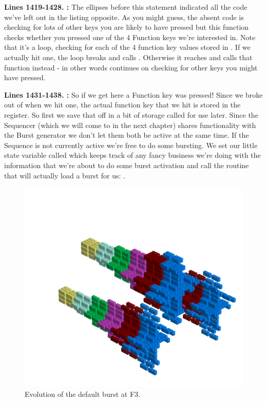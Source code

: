 \textbf{Lines 1419-1428. :} The ellipses before this statement indicated all the code we've
left out in the listing opposite. As you might guess, the absent code is checking for lots of other keys you are likely to have pressed but
this function checks whether you pressed one of the 4 Function keys we're interested in. Note that it's a loop, checking for each of the 4
function key values stored in . If we actually hit one, the loop breaks and calls . Otherwise
it reaches  and calls that function instead - in other words continues on checking for other keys you might have
pressed.

\textbf{Lines 1431-1438. :} So if we get here a Function key was pressed! Since we broke out of 
when we hit one, the actual function key that we hit is stored in the  register. So first we save that off in a bit of storage called
 for use later. Since the Sequencer (which we will come to in the next chapter) shares functionality with the Burst generator
we don't let them both be active at the same time. If the Sequence is not currently active we're free to do some bursting. We set our little state
variable called  which keeps track of any fancy business we're doing with the information that we're about to do some 
burst activation and call the routine that will actually load a burst for us: .


\clearpage
\begin{figure}[H]
    \hspace{-0.5cm}
    \begin{adjustbox}{width=18cm,center}
      \includegraphics[width=12cm]{src/patterns/bursts/pattern1-45.png}%
    \end{adjustbox}
\caption{Evolution of the default burst at F3.}
\end{figure}
\clearpage

